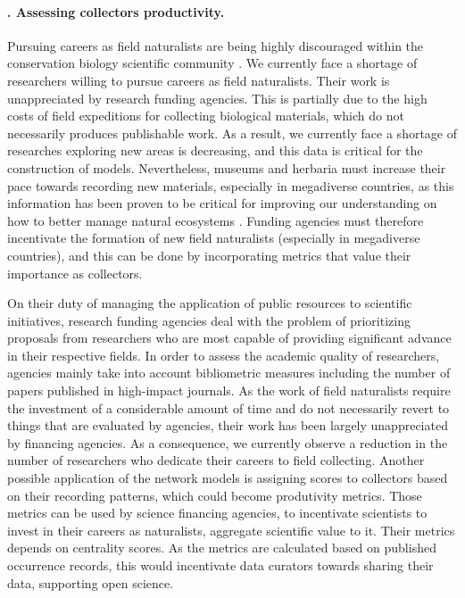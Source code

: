 \paragraph*{\theApplicationCase. Assessing collectors productivity.}
Pursuing careers as field naturalists are being highly discouraged within the conservation biology scientific community \cite{Noss1996}.
We currently face a shortage of researchers willing to pursue careers as field naturalists.
Their work is unappreciated by research funding agencies.
This is partially due to the high costs of field expeditions for collecting biological materials, which do not necessarily produces publishable work.
As a result, we currently face a shortage of researches exploring new areas is decreasing, and this data is critical for the construction of models.
%
Nevertheless, museums and herbaria must increase their pace towards recording new materials, especially in megadiverse countries, as this information has been proven to be critical for improving our understanding on how to better manage natural ecosystems \cite{Soberon2004}.
Funding agencies must therefore incentivate the formation of new field naturalists (especially in megadiverse countries), and this can be done by incorporating metrics that value their importance as collectors.

On their duty of managing the application of public resources to scientific initiatives, research funding agencies deal with the problem of prioritizing proposals from researchers who are most capable of providing significant advance in their respective fields.
In order to assess the academic quality of researchers, agencies mainly take into account bibliometric measures including the number of papers published in high-impact journals. 
%
As the work of field naturalists require the investment of a considerable amount of time and do not necessarily revert to things that are evaluated by agencies, their work has been largely unappreciated by financing agencies.
As a consequence, we currently observe a reduction in the number of researchers who dedicate their careers to field collecting.
%
Another possible application of the network models is assigning scores to collectors based on their recording patterns, which could become produtivity metrics.
Those metrics can be used by science financing agencies, to incentivate scientists to invest in their careers as naturalists, aggregate scientific value to it.
Their metrics depends on centrality scores.
As the metrics are calculated based on published occurrence records, this would incentivate data curators towards sharing their data, supporting open science.


